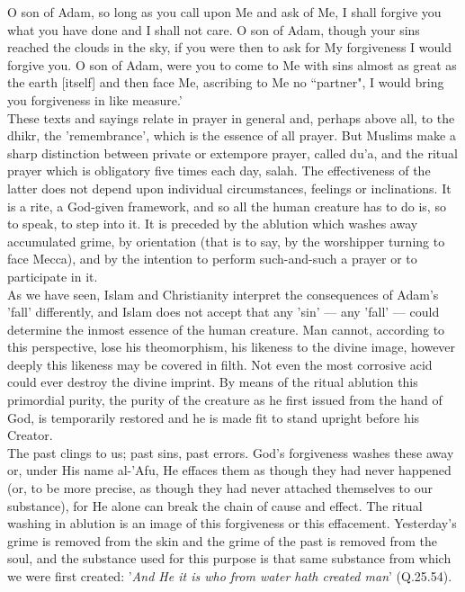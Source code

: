 \documentclass[10pt, twoside]{book}
\begin{document}
O son of Adam, so long as you call upon Me and ask of Me, I shall forgive you what you have done and 
I shall not care. O son of Adam, though your sins reached the clouds in the sky, if you were then to 
ask for My forgiveness I would forgive you. O son of Adam, were you to come to Me with sins almost as 
great as the earth [itself] and then face Me, ascribing to Me no ``partner", I would bring you 
forgiveness in like measure.' \\

These texts and sayings relate in prayer in general and, perhaps above all, to the dhikr, the 
'remembrance', which is the essence of all prayer. But Muslims make a sharp distinction between 
private or extempore prayer, called du'a, and the ritual prayer which is obligatory five times each 
day, salah. The effectiveness of the latter does not depend upon individual circumstances, feelings 
or inclinations. It is a rite, a God\hyp{}given framework, and so all the human creature has to do is, so 
to speak, to step into it. It is preceded by the ablution which washes away accumulated grime, by 
orientation (that is to say, by the worshipper turning to face Mecca), and by the intention to 
perform such\hyp{}and\hyp{}such a prayer or to participate in it. \\

As we have seen, Islam and Christianity interpret the consequences of Adam's 'fall' differently, and 
Islam does not accept that any 'sin' --- any 'fall' --- could determine the inmost essence of the human 
creature. Man cannot, according to this perspective, lose his theomorphism, his likeness to the 
divine image, however deeply this likeness may be covered in filth. Not even the most corrosive acid 
could ever destroy the divine imprint. By means of the ritual ablution this primordial purity, the 
purity of the creature as he first issued from the hand of God, is temporarily restored and he is 
made fit to stand upright before his Creator. \\

The past clings to us; past sins, past errors. God's forgiveness washes these away or, under His name 
al-'Afu, He effaces them as though they had never happened (or, to be more precise, as though they 
had never attached themselves to our substance), for He alone can break the chain of cause and 
effect. The ritual washing in ablution is an image of this forgiveness or this effacement. 
Yesterday's grime is removed from the skin and the grime of the past is removed from the soul, and 
the substance used for this purpose is that same substance from which we were first created: '\emph{And He 
it is who from water hath created man}' (Q.25.54). \\
\end{document}
